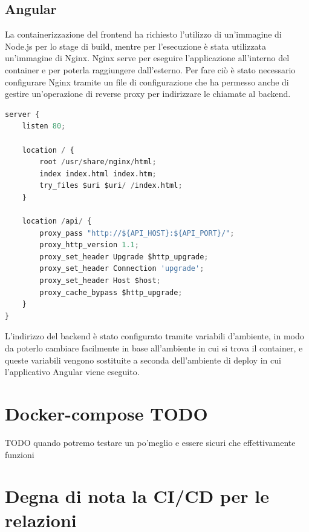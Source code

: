 \subsection{Angular}

La containerizzazione del frontend ha richiesto l'utilizzo di un'immagine di Node.js per lo stage di build, mentre per l'esecuzione è stata utilizzata un'immagine di Nginx.
Nginx serve per eseguire l'applicazione all'interno del container e per poterla raggiungere dall'esterno. Per fare ciò è stato necessario configurare Nginx tramite un file di configurazione che ha permesso anche di gestire un'operazione di reverse proxy per indirizzare le chiamate al backend.

\begin{lstlisting}[language=Python, caption={Configurazione Nginx del front-end}, label=list:nginx_frontend]
server {
    listen 80;
    
    location / {
        root /usr/share/nginx/html;
        index index.html index.htm;
        try_files $uri $uri/ /index.html;
    }

    location /api/ {
        proxy_pass "http://${API_HOST}:${API_PORT}/";
        proxy_http_version 1.1;
        proxy_set_header Upgrade $http_upgrade;
        proxy_set_header Connection 'upgrade';
        proxy_set_header Host $host;
        proxy_cache_bypass $http_upgrade;
    }
}
\end{lstlisting}

L'indirizzo del backend è stato configurato tramite variabili d'ambiente, in modo da poterlo cambiare facilmente in base all'ambiente in cui si trova il container, e queste variabili vengono sostituite a seconda dell'ambiente di deploy in cui l'applicativo Angular viene eseguito.


\section{Docker-compose TODO}
TODO quando potremo testare un po'meglio e essere sicuri che effettivamente funzioni

\section{Degna di nota la CI/CD per le relazioni}


